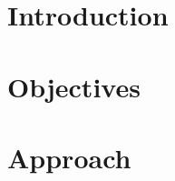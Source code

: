 \documentclass[colorlinks=true,pdfstartview=FitV,linkcolor=blue,
            citecolor=red,urlcolor=magenta]{ligodoc}
\title{}
\author{Jacob Bernhardt}
\begin{document}

\section{Introduction} %
% 


\section{Objectives}


\section{Approach}
\end{document}
